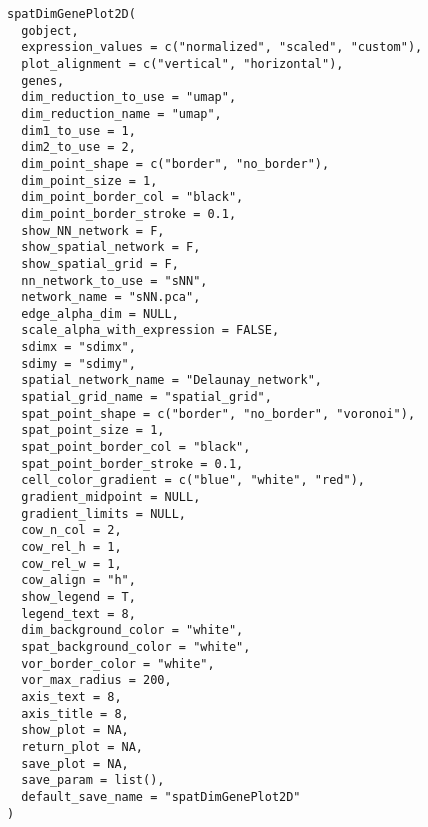 \documentclass[a4paper]{book}
\begin{document}
\begin{Usage}
\begin{verbatim}
spatDimGenePlot2D(
  gobject,
  expression_values = c("normalized", "scaled", "custom"),
  plot_alignment = c("vertical", "horizontal"),
  genes,
  dim_reduction_to_use = "umap",
  dim_reduction_name = "umap",
  dim1_to_use = 1,
  dim2_to_use = 2,
  dim_point_shape = c("border", "no_border"),
  dim_point_size = 1,
  dim_point_border_col = "black",
  dim_point_border_stroke = 0.1,
  show_NN_network = F,
  show_spatial_network = F,
  show_spatial_grid = F,
  nn_network_to_use = "sNN",
  network_name = "sNN.pca",
  edge_alpha_dim = NULL,
  scale_alpha_with_expression = FALSE,
  sdimx = "sdimx",
  sdimy = "sdimy",
  spatial_network_name = "Delaunay_network",
  spatial_grid_name = "spatial_grid",
  spat_point_shape = c("border", "no_border", "voronoi"),
  spat_point_size = 1,
  spat_point_border_col = "black",
  spat_point_border_stroke = 0.1,
  cell_color_gradient = c("blue", "white", "red"),
  gradient_midpoint = NULL,
  gradient_limits = NULL,
  cow_n_col = 2,
  cow_rel_h = 1,
  cow_rel_w = 1,
  cow_align = "h",
  show_legend = T,
  legend_text = 8,
  dim_background_color = "white",
  spat_background_color = "white",
  vor_border_color = "white",
  vor_max_radius = 200,
  axis_text = 8,
  axis_title = 8,
  show_plot = NA,
  return_plot = NA,
  save_plot = NA,
  save_param = list(),
  default_save_name = "spatDimGenePlot2D"
)
\end{verbatim}
\end{Usage}
%
\end{document}
